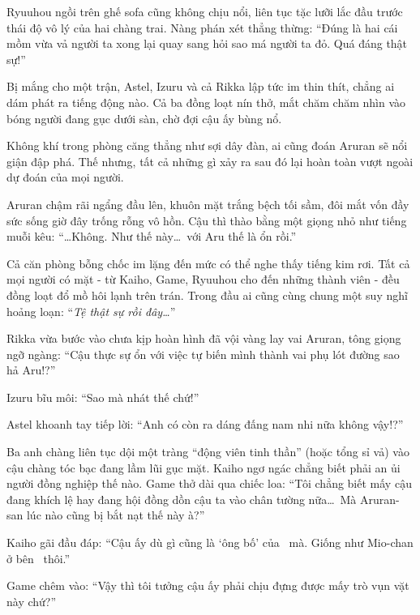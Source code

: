 \documentclass[../main.tex]{subfiles}
\begin{document}
Ryuuhou ngồi trên ghế sofa cũng không chịu nổi, liên tục tặc lưỡi lắc đầu trước thái độ vô lý của hai chàng trai. Nàng phán xét thẳng thừng: ``Đúng là hai cái mồm vừa vả người ta xong lại quay sang hỏi sao má người ta đỏ. Quá đáng thật sự!''

Bị mắng cho một trận, Astel, Izuru và cả Rikka lập tức im thin thít, chẳng ai dám phát ra tiếng động nào. Cả ba đồng loạt nín thở, mắt chăm chăm nhìn vào bóng người đang gục dưới sàn, chờ đợi cậu ấy bùng nổ.


Không khí trong phòng căng thẳng như sợi dây đàn, ai cũng đoán Aruran sẽ nổi giận đập phá. Thế nhưng, tất cả những gì xảy ra sau đó lại hoàn toàn vượt ngoài dự đoán của mọi người.

Aruran chậm rãi ngẩng đầu lên, khuôn mặt trắng bệch tối sầm, đôi mắt vốn đầy sức sống giờ đây trống rỗng vô hồn. Cậu thì thào bằng một giọng nhỏ như tiếng muỗi kêu: ``\dots Không. Như thế này\dots\ với Aru thế là ổn rồi.''

Cả căn phòng bỗng chốc im lặng đến mức có thể nghe thấy tiếng kim rơi. Tất cả mọi người có mặt - từ Kaiho, Game, Ryuuhou cho đến những thành viên \hls - đều đồng loạt đổ mồ hôi lạnh trên trán. Trong đầu ai cũng cùng chung một suy nghĩ hoảng loạn: ``\textit{Tệ thật sự rồi đây\dots}''

\omk

Rikka vừa bước vào chưa kịp hoàn hình đã vội vàng lay vai Aruran, tông giọng ngỡ ngàng: ``Cậu thực sự ổn với việc tự biến mình thành vai phụ lót đường sao hả Aru!?''

Izuru bĩu môi: ``Sao mà nhát thế chứ!''

Astel khoanh tay tiếp lời: ``Anh có còn ra dáng đấng nam nhi nữa không vậy!?''

Ba anh chàng liên tục dội một tràng ``động viên tinh thần'' (hoặc tổng sỉ vả) vào cậu chàng tóc bạc đang lầm lũi gục mặt. Kaiho ngơ ngác chẳng biết phải an ủi người đồng nghiệp thế nào. Game thở dài qua chiếc loa: ``Tôi chẳng biết mấy cậu đang khích lệ hay đang hội đồng dồn cậu ta vào chân tường nữa\dots\ Mà Aruran-san lúc nào cũng bị bắt nạt thế này à?''

Kaiho gãi đầu đáp: ``Cậu ấy dù gì cũng là `ông bố' của \hls\ mà. Giống như Mio-chan ở bên \hll\ thôi.''

Game chêm vào: ``Vậy thì tôi tưởng cậu ấy phải chịu đựng được mấy trò vụn vặt này chứ?''
\end{document}

